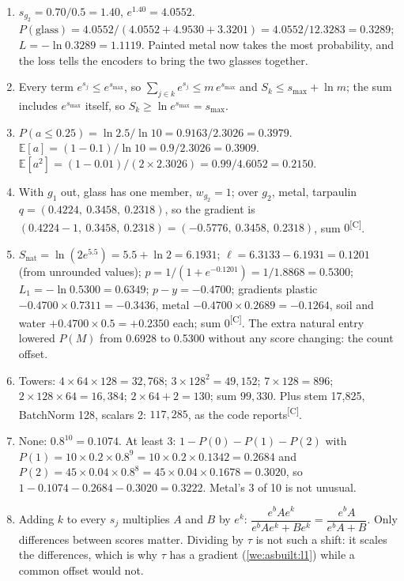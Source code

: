 \documentclass[11pt,a4paper,oneside,openany]{book}
\newcommand{\comp}{\textsuperscript{\textsf{\scriptsize[C]}}}
\newcommand{\E}{\mathbb{E}}
\begin{document}
\begin{answers}
\begin{enumerate}
\item $s_{g_2}=0.70/0.5=1.40$, $e^{1.40}=4.0552$. $P(\text{glass})=4.0552/(4.0552+4.9530+3.3201)=4.0552/12.3283=0.3289$; $L=-\ln0.3289=1.1119$. Painted metal now
takes the most probability, and the loss tells the encoders to bring the two glasses together.
\item Every term $e^{s_j}\le e^{s_{\max}}$, so $\sum_{j\in k}e^{s_j}\le m\,e^{s_{\max}}$ and $S_k\le s_{\max}+\ln m$; the sum includes $e^{s_{\max}}$ itself, so
$S_k\ge\ln e^{s_{\max}}=s_{\max}$.
\item $P(a\le0.25)=\ln2.5/\ln10=0.9163/2.3026=0.3979$. $\E[a]=(1-0.1)/\ln10=0.9/2.3026=0.3909$. $\E[a^2]=(1-0.01)/(2\times2.3026)=0.99/4.6052=0.2150$.
\item With $g_1$ out, glass has one member, $w_{g_2}=1$; over $g_2$, metal, tarpaulin $q=(0.4224,\ 0.3458,\ 0.2318)$, so the gradient is
$(0.4224-1,\ 0.3458,\ 0.2318)=(-0.5776,\ 0.3458,\ 0.2318)$, sum $0$\comp.
\item $S_{\mathrm{nat}}=\ln(2e^{5.5})=5.5+\ln2=6.1931$; $\ell=6.3133-6.1931=0.1201$ (from unrounded values); $p=1/(1+e^{-0.1201})=1/1.8868=0.5300$; $L_1=-\ln0.5300=0.6349$;
$p-y=-0.4700$; gradients plastic $-0.4700\times0.7311=-0.3436$, metal $-0.4700\times0.2689=-0.1264$, soil and water $+0.4700\times0.5=+0.2350$ each; sum 0\comp. The extra
natural entry lowered $P(M)$ from 0.6928 to 0.5300 without any score changing: the count offset.
\item Towers: $4\times64\times128=32{,}768$; $3\times128^2=49{,}152$; $7\times128=896$; $2\times128\times64=16{,}384$; $2\times64+2=130$; sum $99{,}330$. Plus stem 17,825, BatchNorm
128, scalars 2: $117{,}285$, as the code reports\comp.
\item None: $0.8^{10}=0.1074$. At least 3: $1-P(0)-P(1)-P(2)$ with $P(1)=10\times0.2\times0.8^9=10\times0.2\times0.1342=0.2684$ and
$P(2)=45\times0.04\times0.8^8=45\times0.04\times0.1678=0.3020$, so $1-0.1074-0.2684-0.3020=0.3222$. Metal's 3 of 10 is not unusual.
\item Adding $k$ to every $s_j$ multiplies $A$ and $B$ by $e^{k}$: $\dfrac{e^bAe^k}{e^bAe^k+Be^k}=\dfrac{e^bA}{e^bA+B}$. Only differences between scores matter. Dividing by
$\tau$ is not such a shift: it scales the differences, which is why $\tau$ has a gradient (\cref{we:asbuilt:l1}) while a common offset would not.
\end{enumerate}
\end{answers}
\end{document}
